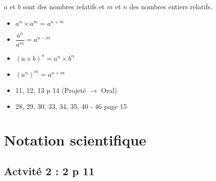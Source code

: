 \documentclass[12pt,a4paper]{article}
\begin{document}
	
\begin{mybilan}	
	$a$ et $b$ sont des nombres relatifs et $m$ et $n$ des nombres entiers relatifs.
	
	\begin{itemize}
		\item $a^n \times a^m = a^{n+m}$
		\item $\dfrac{a^n}{a^m}= a^{n-m}$
		\item $(a \times b)^n = a^n \times b^n$
		\item $(a^n)^m = a^{n+m}$
	\end{itemize}
	
\end{mybilan}

\begin{myexos}
	\begin{itemize}
		\item 11, 12, 13 p 14 (Projeté $\rightarrow$ Oral)
		\item 28, 29, 30, 33, 34, 35, 40 - 46 page 15
	\end{itemize}
	
\end{myexos}

\section{Notation scientifique}

\subsection*{Actvité 2 : 2 p 11}
	
\end{document}
